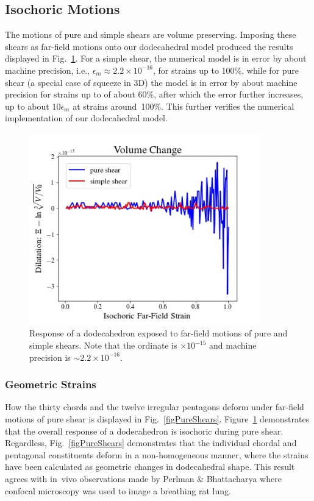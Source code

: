 \subsection{Isochoric Motions}

The motions of pure and simple shears are volume preserving.  Imposing these shears as far-field motions onto our dodecahedral model produced the results displayed in Fig.~\ref{figIsochoric}.  For a simple shear, the numerical model is in error by about machine precision, i.e., $\epsilon_m \approx 2.2 \times 10^{-16}$, for strains up to 100\%, while for pure shear (a special case of squeeze in 3D) the model is in error by about machine precision for strains up to of about 60\%, after which the error further increases, up to about $10\epsilon_m$ at strains around~100\%.  This further verifies the numerical implementation of our dodecahedral model.

\begin{figure}
	\centering
	\includegraphics[width=10cm]{figures/isochoric.jpg}
	\caption{Response of a dodecahedron exposed to far-field motions of pure and simple shears.  Note that the ordinate is $\times 10^{-15}$ and machine precision is $\sim 2.2 \times 10^{-16}$.}
	\label{figIsochoric}
\end{figure}

\subsubsection{Geometric Strains}

How the thirty chords and the twelve irregular pentagons deform under far-field motions of pure shear is displayed in Fig.~\ref{figPureShears}.  Figure~\ref{figIsochoric} demonstrates that the overall response of a dodecahedron is isochoric during pure shear.  Regardless, Fig.~\ref{figPureShears} demonstrates that the individual chordal and pentagonal constituents deform in a non-homogeneous manner, where the strains have been calculated as geometric changes in dodecahedral shape.  This result agrees with in~vivo observations made by Perlman \& Bhattacharya \cite{PerlmanBhattacharya07} where confocal microscopy was used to image a breathing rat lung.

